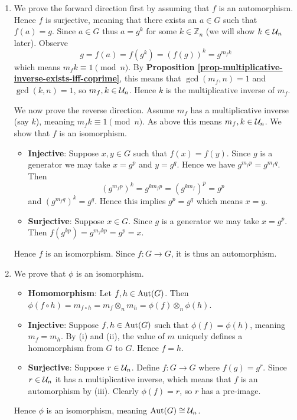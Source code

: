 \begin{enumerate}
\begin{enumerate}[label=(\roman*)]
        \item We prove the forward direction first by assuming that $f$ is an automorphism. Hence $f$ is surjective, meaning that there exists an $a \in G$ such that $f(a) = g$. Since $a \in G$ thus $a = g^k$ for some $k \in \mathbb{Z}_n$ (we will show $k \in \mathcal{U}_{n}$ later). Observe
        \[
            g = f(a) = f(g^k) = (f(g))^k = g^{m_fk}        
        \]
        which means $m_fk \equiv 1 \pmod n$. By \textbf{Proposition \ref{prop-multiplicative-inverse-exists-iff-coprime}}, this means that $\gcd(m_f, n) = 1$ and $\gcd(k, n) = 1$, so $m_f, k \in \mathcal{U}_{n}$. Hence $k$ is the multiplicative inverse of $m_f$.
        
        We now prove the reverse direction. Assume $m_f$ has a multiplicative inverse (say $k$), meaning $m_fk \equiv 1 \pmod n$. As above this means $m_f, k \in \mathcal{U}_{n}$. We show that $f$ is an isomorphism.
        \begin{itemize}
            \item \textbf{Injective}: Suppose $x, y \in G$ such that $f(x) = f(y)$. Since $g$ is a generator we may take $x = g^p$ and $y = g^q$. Hence we have $g^{m_fp} = g^{m_fq}$. Then
            \[
                \left(g^{m_fp}\right)^k = g^{km_fp} = \left(g^{km_f}\right)^p = g^p            
            \]
            and $\left(g^{m_fq}\right)^k = g^q$. Hence this implies $g^p = g^q$ which means $x = y$.
            \item \textbf{Surjective}: Suppose $x \in G$. Since $g$ is a generator we may take $x = g^p$. Then $f(g^{kp}) = g^{m_fkp} = g^p = x$.
        \end{itemize}
        Hence $f$ is an isomorphism. Since $f: G \to G$, it is thus an automorphism.
        
        \item We prove that $\phi$ is an isomorphism.
        \begin{itemize}
            \item \textbf{Homomorphism}: Let $f, h \in \mathrm{Aut}(G)$. Then $\phi(f\circ h) = m_{f\circ h} = m_f \otimes_n m_h = \phi(f)\otimes_n\phi(h)$.
            \item \textbf{Injective}: Suppose $f, h \in \mathrm{Aut}(G)$ such that $\phi(f) = \phi(h)$, meaning $m_f = m_h$. By (i) and (ii), the value of $m$ uniquely defines a homomorphism from $G$ to $G$. Hence $f = h$.
            \item \textbf{Surjective}: Suppose $r \in \mathcal{U}_{n}$. Define $f: G \to G$ where $f(g) = g^r$. Since $r \in \mathcal{U}_{n}$ it has a multiplicative inverse, which means that $f$ is an automorphism by (iii). Clearly $\phi(f) = r$, so $r$ has a pre-image.
        \end{itemize}
        Hence $\phi$ is an isomorphism, meaning $\mathrm{Aut}(G) \cong \mathcal{U}_{n}$.
    \end{enumerate}
\end{enumerate}

